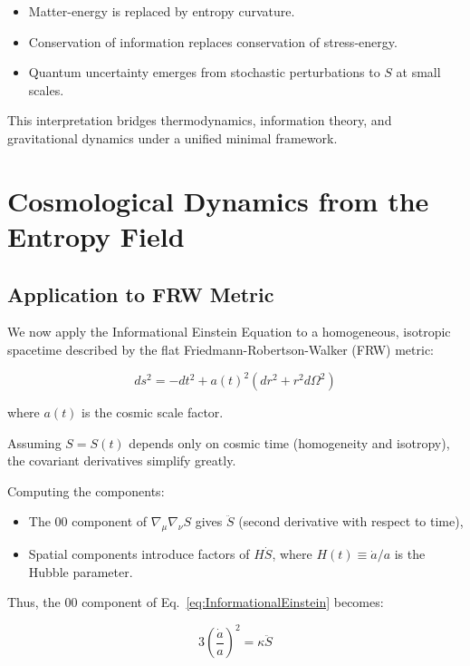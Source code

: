 \documentclass{article}
\begin{document}
\begin{itemize}
    \item Matter-energy is replaced by entropy curvature.
    \item Conservation of information replaces conservation of stress-energy.
    \item Quantum uncertainty emerges from stochastic perturbations to $S$ at small scales.
\end{itemize}

This interpretation bridges thermodynamics, information theory, and gravitational dynamics under a unified minimal framework.

\section{Cosmological Dynamics from the Entropy Field}

\subsection{Application to FRW Metric}

We now apply the Informational Einstein Equation to a homogeneous, isotropic spacetime described by the flat Friedmann-Robertson-Walker (FRW) metric:

\begin{equation}
ds^2 = -dt^2 + a(t)^2 \left( dr^2 + r^2 d\Omega^2 \right)
\end{equation}

where $a(t)$ is the cosmic scale factor.

Assuming $S = S(t)$ depends only on cosmic time (homogeneity and isotropy), the covariant derivatives simplify greatly.

Computing the components:

\begin{itemize}
\item The $00$ component of $\nabla_\mu \nabla_\nu S$ gives $\ddot{S}$ (second derivative with respect to time),
\item Spatial components introduce factors of $H \dot{S}$, where $H(t) \equiv \dot{a}/a$ is the Hubble parameter.
\end{itemize}

Thus, the $00$ component of Eq.~\eqref{eq:InformationalEinstein} becomes:

\begin{equation}
3\left( \frac{\dot{a}}{a} \right)^2 = \kappa \ddot{S}
\label{eq:FriedmannEntropy}
\end{equation}
\end{document}
